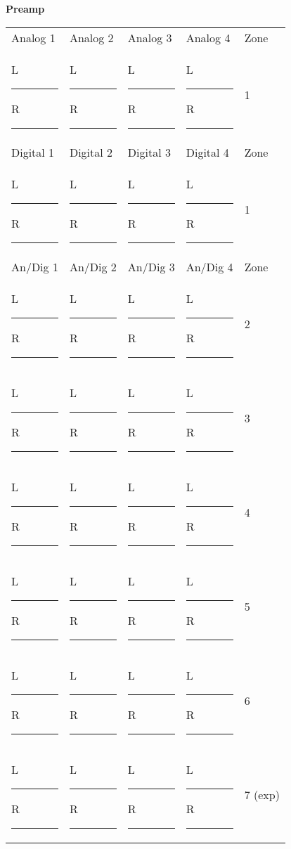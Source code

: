 \documentclass{article}
\begin{document}
\begin{minipage}[t]{0.52\textwidth}
  \begin{checklist}
    \item \textbf{Preamp}
  \end{checklist}

  {\renewcommand{\arraystretch}{1.5} %
  \begin{tabularx}{\linewidth}{XXXXX}
    Analog 1 & Analog 2 & Analog 3 & Analog 4 & Zone \\
    L \rule{1.2em}{0.4pt} R \rule{1.2em}{0.4pt} & L \rule{1.2em}{0.4pt} R \rule{1.2em}{0.4pt} &
      L \rule{1.2em}{0.4pt} R \rule{1.2em}{0.4pt} & L \rule{1.2em}{0.4pt} R \rule{1.2em}{0.4pt} & 1 \\
    Digital 1 & Digital 2 & Digital 3 & Digital 4 & Zone \\
    L \rule{1.2em}{0.4pt} R \rule{1.2em}{0.4pt} & L \rule{1.2em}{0.4pt} R \rule{1.2em}{0.4pt} &
      L \rule{1.2em}{0.4pt} R \rule{1.2em}{0.4pt} & L \rule{1.2em}{0.4pt} R \rule{1.2em}{0.4pt} & 1 \\
    An/Dig 1 & An/Dig 2 & An/Dig 3 & An/Dig 4 & Zone \\
    L \rule{1.2em}{0.4pt} R \rule{1.2em}{0.4pt} & L \rule{1.2em}{0.4pt} R \rule{1.2em}{0.4pt} &
      L \rule{1.2em}{0.4pt} R \rule{1.2em}{0.4pt} & L \rule{1.2em}{0.4pt} R \rule{1.2em}{0.4pt} & 2 \\
    L \rule{1.2em}{0.4pt} R \rule{1.2em}{0.4pt} & L \rule{1.2em}{0.4pt} R \rule{1.2em}{0.4pt} &
      L \rule{1.2em}{0.4pt} R \rule{1.2em}{0.4pt} & L \rule{1.2em}{0.4pt} R \rule{1.2em}{0.4pt} & 3 \\
    L \rule{1.2em}{0.4pt} R \rule{1.2em}{0.4pt} & L \rule{1.2em}{0.4pt} R \rule{1.2em}{0.4pt} &
      L \rule{1.2em}{0.4pt} R \rule{1.2em}{0.4pt} & L \rule{1.2em}{0.4pt} R \rule{1.2em}{0.4pt} & 4 \\
    L \rule{1.2em}{0.4pt} R \rule{1.2em}{0.4pt} & L \rule{1.2em}{0.4pt} R \rule{1.2em}{0.4pt} &
      L \rule{1.2em}{0.4pt} R \rule{1.2em}{0.4pt} & L \rule{1.2em}{0.4pt} R \rule{1.2em}{0.4pt} & 5 \\
    L \rule{1.2em}{0.4pt} R \rule{1.2em}{0.4pt} & L \rule{1.2em}{0.4pt} R \rule{1.2em}{0.4pt} &
      L \rule{1.2em}{0.4pt} R \rule{1.2em}{0.4pt} & L \rule{1.2em}{0.4pt} R \rule{1.2em}{0.4pt} & 6 \\
    L \rule{1.2em}{0.4pt} R \rule{1.2em}{0.4pt} & L \rule{1.2em}{0.4pt} R \rule{1.2em}{0.4pt} &
      L \rule{1.2em}{0.4pt} R \rule{1.2em}{0.4pt} & L \rule{1.2em}{0.4pt} R \rule{1.2em}{0.4pt} & 7 (exp) \\
  \end{tabularx}}
\end{minipage}
\end{document}
